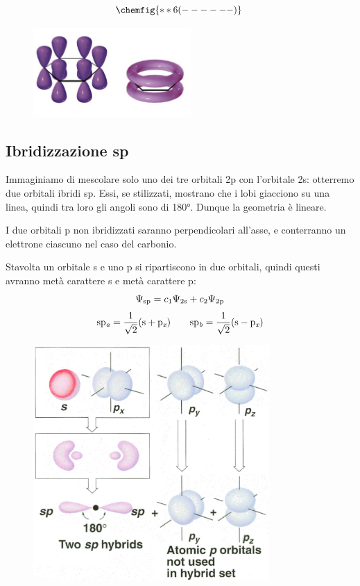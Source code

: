 \hspace{1cm}\begin{minipage}{0.4\textwidth}
    $$
    \chemfig{**6(------)}\
    $$
\end{minipage} \hfill
\begin{minipage}{0.6\textwidth}
    \begin{figure}[H]
        \includegraphics[width=6cm]{immagini/benzene.png}
    \end{figure}
\end{minipage}

\subsection{Ibridizzazione sp}
Immaginiamo di mescolare solo uno dei tre orbitali 2p con l'orbitale 2s: otterremo due orbitali ibridi sp. Essi, se stilizzati, mostrano che i lobi giacciono su una linea, quindi tra loro gli angoli sono di 180°. Dunque la geometria è lineare.

I due orbitali p non ibridizzati saranno perpendicolari all'asse, e conterranno un elettrone ciascuno nel caso del carbonio.

Stavolta un orbitale s e uno p si ripartiscono in due orbitali, quindi questi avranno metà carattere s e metà carattere p:
$$\Psi_{\rm sp}= c_1\Psi_{\rm 2s} + c_2\Psi_{\rm 2p}$$
$$
\rm sp_{\textit{a}}=\frac{1}{\sqrt{2}}(s + p_{\textit{x}})
\qquad
sp_{\textit{b}}=\frac{1}{\sqrt{2}}(s - p_{\textit{x}})
$$
\begin{figure}[H]
    \centering
    \includegraphics[width=9cm]{immagini/orbitali-sp.png}
\end{figure}

